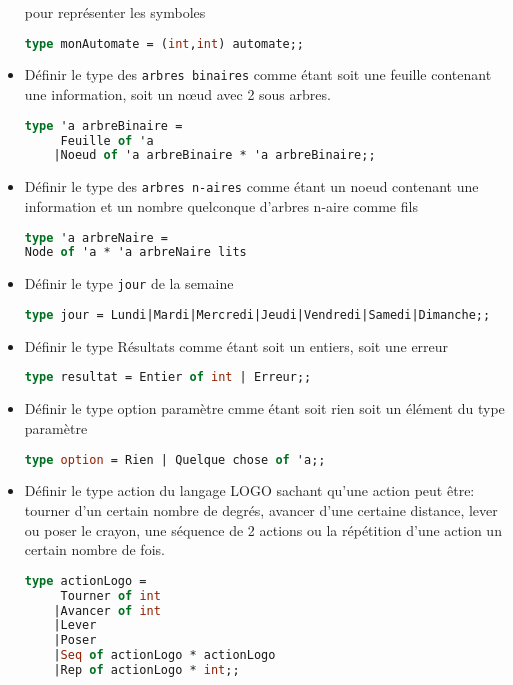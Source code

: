 \begin{exemple}
\begin{itemize}
	pour représenter les symboles
	\begin{lstlisting}[language=Caml, numbers=none, framerule=0pt]
type monAutomate = (int,int) automate;;
	\end{lstlisting}
\item Définir le type des \texttt{arbres binaires} comme étant soit une feuille contenant une information, soit un nœud avec 2 sous arbres.
	\begin{lstlisting}[language=Caml, numbers=none, framerule=0pt]
type 'a arbreBinaire = 
	 Feuille of 'a 
	|Noeud of 'a arbreBinaire * 'a arbreBinaire;;
	\end{lstlisting}
\item Définir le type des \texttt{arbres n-aires} comme étant un noeud contenant une information et un nombre quelconque d'arbres n-aire comme fils
	\begin{lstlisting}[language=Caml, numbers=none, framerule=0pt]
type 'a arbreNaire = 
Node of 'a * 'a arbreNaire lits
	\end{lstlisting}
\item Définir le type \texttt{jour} de la semaine
	\begin{lstlisting}[language=Caml, numbers=none, framerule=0pt]
type jour = Lundi|Mardi|Mercredi|Jeudi|Vendredi|Samedi|Dimanche;;
	\end{lstlisting}
\item Définir le type Résultats comme étant soit un entiers, soit une erreur
	\begin{lstlisting}[language=Caml, numbers=none, framerule=0pt]
	type resultat = Entier of int | Erreur;;
	\end{lstlisting}
\item Définir le type option paramètre cmme étant soit rien soit un élément du type paramètre
	\begin{lstlisting}[language=Caml, numbers=none, framerule=0pt]
	type option = Rien | Quelque chose of 'a;;
	\end{lstlisting}
\item Définir le type action du langage LOGO sachant qu'une action peut être: tourner d'un certain nombre de degrés, avancer d'une certaine distance,
	lever ou poser le crayon, une séquence de 2 actions ou la répétition d'une action un certain nombre de fois.
	\begin{lstlisting}[language=Caml, numbers=none, framerule=0pt]
type actionLogo = 
	 Tourner of int
	|Avancer of int
	|Lever
	|Poser
	|Seq of actionLogo * actionLogo
	|Rep of actionLogo * int;;
	\end{lstlisting}
	\end{itemize}
\end{exemple}

